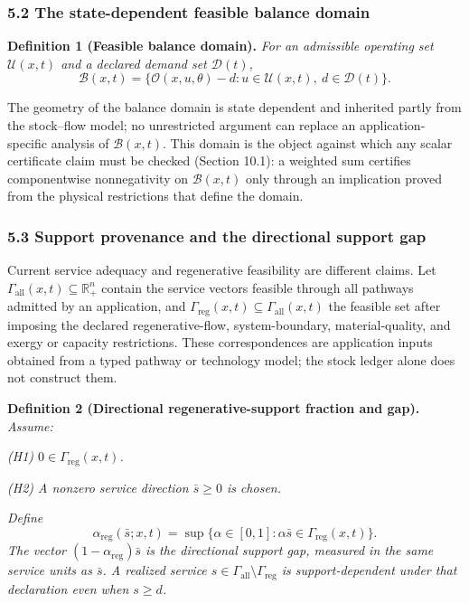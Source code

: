 \documentclass[11pt]{article}
\begin{document}
\subsubsection{5.2 The state-dependent feasible balance
domain}\label{the-state-dependent-feasible-balance-domain}

\textbf{Definition 1 (Feasible balance domain).} \emph{For an admissible
operating set \(\mathcal{U}(x,t)\) and a declared demand set
\(\mathcal{D}(t)\),}
\[\mathcal{B}(x,t) = \{ \mathcal{O}(x,u,\theta) - d : u \in \mathcal{U}(x,t),\ d \in \mathcal{D}(t) \}.\]

The geometry of the balance domain is state dependent and inherited
partly from the stock--flow model; no unrestricted argument can replace
an application-specific analysis of \(\mathcal{B}(x,t)\). This domain is
the object against which any scalar certificate claim must be checked
(Section 10.1): a weighted sum certifies componentwise nonnegativity on
\(\mathcal{B}(x,t)\) only through an implication proved from the
physical restrictions that define the domain.

\subsubsection{5.3 Support provenance and the directional support
gap}\label{support-provenance-and-the-directional-support-gap}

Current service adequacy and regenerative feasibility are different
claims. Let \(\Gamma_{\mathrm{all}}(x,t) \subseteq \mathbb{R}^n_+\)
contain the service vectors feasible through all pathways admitted by an
application, and
\(\Gamma_{\mathrm{reg}}(x,t) \subseteq \Gamma_{\mathrm{all}}(x,t)\) the
feasible set after imposing the declared regenerative-flow,
system-boundary, material-quality, and exergy or capacity restrictions.
These correspondences are application inputs obtained from a typed
pathway or technology model; the stock ledger alone does not construct
them.

\textbf{Definition 2 (Directional regenerative-support fraction and
gap).} \emph{Assume:}

\emph{(H1) \(0 \in \Gamma_{\mathrm{reg}}(x,t)\).}

\emph{(H2) A nonzero service direction \(\bar s \ge 0\) is chosen.}

\emph{Define}
\[\alpha_{\mathrm{reg}}(\bar s; x, t) = \sup\{ \alpha \in [0,1] : \alpha \bar s \in \Gamma_{\mathrm{reg}}(x,t) \}.\]
\emph{The vector \((1 - \alpha_{\mathrm{reg}})\bar s\) is the
directional support gap, measured in the same service units as
\(\bar s\). A realized service
\(s \in \Gamma_{\mathrm{all}} \setminus \Gamma_{\mathrm{reg}}\) is
support-dependent under that declaration even when \(s \ge d\).}
\end{document}
